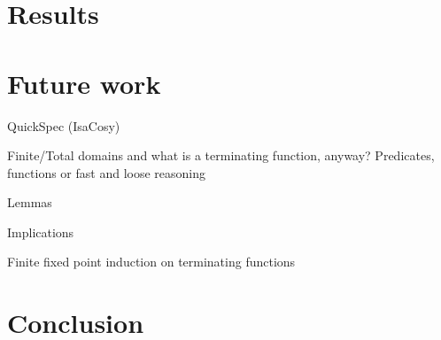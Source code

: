 \documentclass{report}
\begin{document}
\section{Results}

\section{Future work}

QuickSpec (IsaCosy)

Finite/Total domains and what is a terminating function, anyway?
Predicates, functions or fast and loose reasoning \cite{fastandloose}

Lemmas

Implications

Finite fixed point induction on terminating functions

\section{Conclusion}




\end{document}

